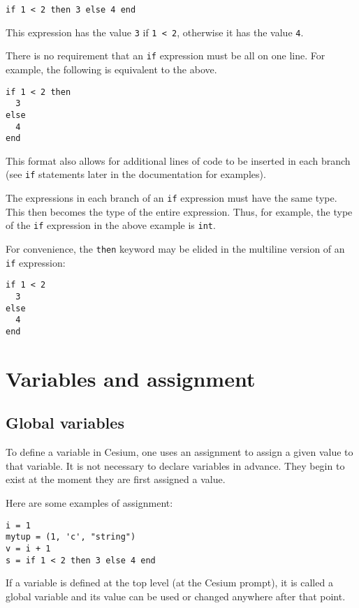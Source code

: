\documentclass[a4paper,10pt]{article}
\newcommand{\code}{\lstinline}
\begin{document}
{\begin{lstlisting}
if 1 < 2 then 3 else 4 end
\end{lstlisting}

This expression has the value \code{3} if \code{1 < 2}, otherwise it has the value \code{4}.

There is no requirement that an \code{if} expression must be all on one line. For example,
the following is equivalent to the above.

\begin{lstlisting}
if 1 < 2 then 
  3 
else 
  4 
end
\end{lstlisting}

This format also allows for additional lines of code to be inserted in each branch (see
\code{if} statements later in the documentation for examples). 

The expressions in each branch of an \code{if} expression must have the same type. This then 
becomes the type of the entire expression. Thus, for example, the type of the \code{if} 
expression in the above example is \code{int}.

For convenience, the \code{then} keyword may be elided in the multiline version of an \code{if}
expression:

\begin{lstlisting}
if 1 < 2
  3 
else 
  4 
end
\end{lstlisting}

\section{Variables and assignment}

\subsection{Global variables}

To define a variable in Cesium, one uses an assignment to assign a given value to that variable.
It is not necessary to declare variables in advance. They begin to exist at the moment they are
first assigned a value.

Here are some examples of assignment:

\begin{lstlisting}
i = 1
mytup = (1, 'c', "string")
v = i + 1
s = if 1 < 2 then 3 else 4 end
\end{lstlisting}

If a variable is defined at the top level (at the Cesium prompt), it is called a global variable
and its value can be used or changed anywhere after that point.

}
\end{document}
